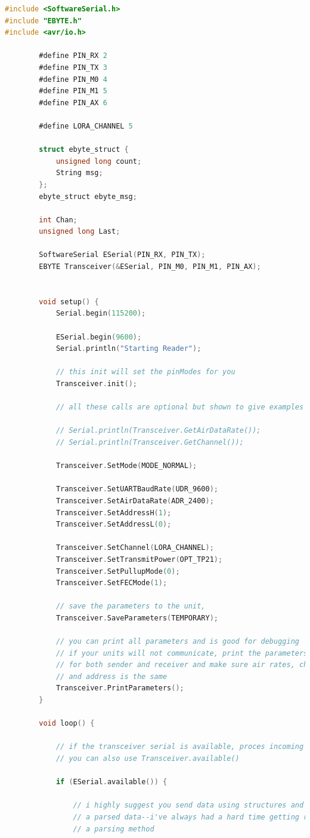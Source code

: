 \documentclass[12pt]{article}
\begin{document}
	\begin{lstlisting}[language=C]
#include <SoftwareSerial.h>
#include "EBYTE.h"
#include <avr/io.h>
		
		#define PIN_RX 2
		#define PIN_TX 3
		#define PIN_M0 4
		#define PIN_M1 5
		#define PIN_AX 6
		
		#define LORA_CHANNEL 5
		
		struct ebyte_struct {
			unsigned long count;
			String msg;                                           
		};
		ebyte_struct ebyte_msg;
		
		int Chan;
		unsigned long Last;
		
		SoftwareSerial ESerial(PIN_RX, PIN_TX);
		EBYTE Transceiver(&ESerial, PIN_M0, PIN_M1, PIN_AX);
		
		
		void setup() {
			Serial.begin(115200);
			
			ESerial.begin(9600);
			Serial.println("Starting Reader");
			
			// this init will set the pinModes for you
			Transceiver.init();
			
			// all these calls are optional but shown to give examples of what you can do
			
			// Serial.println(Transceiver.GetAirDataRate());
			// Serial.println(Transceiver.GetChannel());
			
			Transceiver.SetMode(MODE_NORMAL);
			
			Transceiver.SetUARTBaudRate(UDR_9600);
			Transceiver.SetAirDataRate(ADR_2400);
			Transceiver.SetAddressH(1);
			Transceiver.SetAddressL(0);
			
			Transceiver.SetChannel(LORA_CHANNEL);
			Transceiver.SetTransmitPower(OPT_TP21);
			Transceiver.SetPullupMode(0);
			Transceiver.SetFECMode(1);
			
			// save the parameters to the unit,
			Transceiver.SaveParameters(TEMPORARY);
			
			// you can print all parameters and is good for debugging
			// if your units will not communicate, print the parameters
			// for both sender and receiver and make sure air rates, channel
			// and address is the same
			Transceiver.PrintParameters();
		}
		
		void loop() {
			
			// if the transceiver serial is available, proces incoming data
			// you can also use Transceiver.available()
			
			if (ESerial.available()) {
				
				// i highly suggest you send data using structures and not
				// a parsed data--i've always had a hard time getting reliable data using
				// a parsing method
				

\end{lstlisting}
\end{document}
